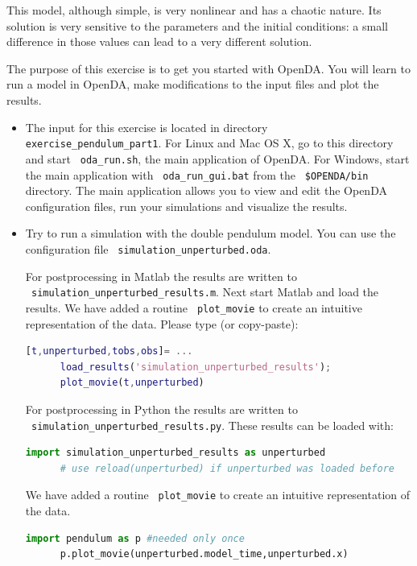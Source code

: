 This model, although simple, is very nonlinear and has a chaotic nature.  Its
solution is very sensitive to the parameters and the initial conditions: a
small difference in those values can lead to a very different solution.

The purpose of this exercise is to get you started with OpenDA. You will learn
to run a model in OpenDA, make modifications to the input files and plot the
results.

\begin{itemize}
\item The input for this exercise is located in directory \texttt{ exercise\_pendulum\_part1}.
      For Linux and Mac OS X, go to this directory and start \texttt{ oda\_run.sh}, the
      main application of OpenDA. For Windows, start the main application with 
      \texttt{ oda\_run\_gui.bat} from the \texttt{ \$OPENDA/bin} directory. The main 
      application allows you to view and edit the OpenDA configuration files, run your
      simulations and visualize the results.
\item Try to run a simulation with the double pendulum model. You can use the
      configuration file \texttt{ simulation\_unperturbed.oda}. 
      
\ifshowmatlab
      For postprocessing in Matlab the results are written to \\ \texttt{ simulation\_unperturbed\_results.m}.
      Next start Matlab and load the results. We have added a routine \texttt{ plot\_movie} to create an intuitive
      representation of the data. Please type (or copy-paste):
      \begin{lstlisting}[language=Matlab,frame=single,caption={Matlab}]
      [t,unperturbed,tobs,obs]= ...
      load_results('simulation_unperturbed_results');
      plot_movie(t,unperturbed)
      \end{lstlisting}
\fi
      
      For postprocessing in Python the results are written to \\ \texttt{ simulation\_unperturbed\_results.py}.
      These results can be loaded with:
      \begin{lstlisting}[language=Python,frame=single,caption={Python initialize}]
      import simulation_unperturbed_results as unperturbed
      # use reload(unperturbed) if unperturbed was loaded before
      \end{lstlisting}
      We have added a routine \texttt{ plot\_movie} to create an intuitive
      representation of the data. 
      \begin{lstlisting}[language=Python,frame=single,caption={Python}]
      import pendulum as p #needed only once
      p.plot_movie(unperturbed.model_time,unperturbed.x)
      \end{lstlisting}
      

\end{itemize}
